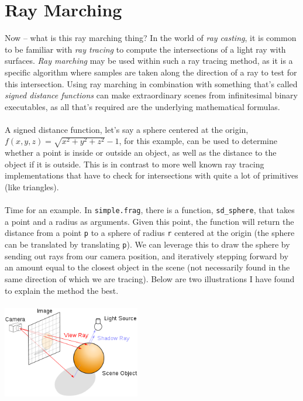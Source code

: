 \documentclass[abstract=off,oneside]{scrreprt}
\begin{document}
\section*{Ray Marching}
\label{sec-3}
Now -- what is this ray marching thing? In the world of \emph{ray casting},
it is common to be familiar with \emph{ray tracing} to compute the
intersections of a light ray with surfaces. \emph{Ray marching} may be used
within such a ray tracing method, as it is a specific algorithm where
samples are taken along the direction of a ray to test for this
intersection. Using ray marching in combination with something that's
called \emph{signed distance functions} can make extraordinary
scenes from infinitesimal binary executables, as all that's required
are the underlying mathematical formulas.
\\\\
A signed distance function, let's say a sphere centered at the origin,
$f(x, y, z) = \sqrt{x^2 + y^2 + z^2} - 1$, for this example, can be
used to determine whether a point is inside or outside an object, as
well as the distance to the object if it is outside. This is in
contrast to more well known ray tracing implementations that have to
check for intersections with quite a lot of primitives (like
triangles).
\\\\
Time for an example. In \verb~simple.frag~, there is a function,
\verb~sd_sphere~, that takes a point and a radius as arguments. Given this
point, the function will return the distance from a point \verb~p~ to a
sphere of radius \verb~r~ centered at the origin (the sphere can be
translated by translating \verb~p~). We can leverage this to draw the
sphere by sending out rays from our camera position, and iteratively
stepping forward by an amount equal to the closest object in the scene
(not necessarily found in the same direction of which we are
tracing). Below are two illustrations I have found to explain the
method the best.
\\\\
\includegraphics[width=0.45\textwidth]{./img/raytrace.png}
$\hspace{35pt}$
\end{document}
